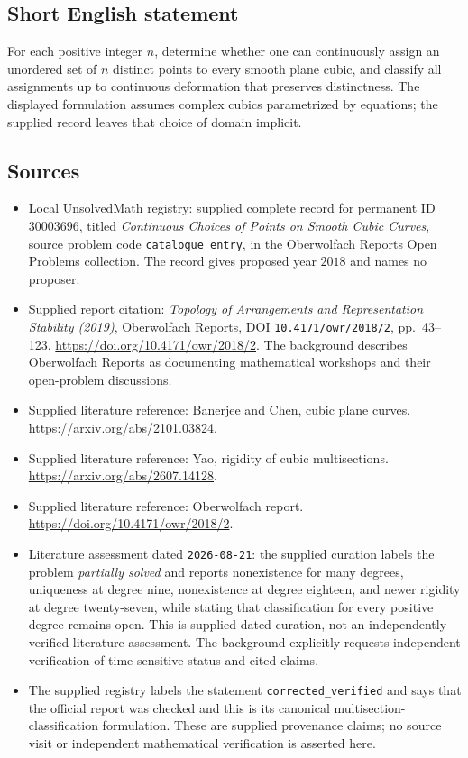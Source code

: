 \documentclass[11pt]{article}
\begin{document}
\subsection{Short English statement}
For each positive integer \(n\), determine whether one can continuously assign an unordered set of \(n\) distinct points to every smooth plane cubic, and classify all assignments up to continuous deformation that preserves distinctness. The displayed formulation assumes complex cubics parametrized by equations; the supplied record leaves that choice of domain implicit.
\subsection{Sources}
\begin{itemize}
\item Local UnsolvedMath registry: supplied complete record for permanent ID \(30003696\), titled \emph{Continuous Choices of Points on Smooth Cubic Curves}, source problem code \texttt{catalogue entry}, in the Oberwolfach Reports Open Problems collection. The record gives proposed year \(2018\) and names no proposer.
\item Supplied report citation: \emph{Topology of Arrangements and Representation Stability (2019)}, Oberwolfach Reports, DOI \texttt{10.4171/owr/2018/2}, pp.\ 43--123. \url{https://doi.org/10.4171/owr/2018/2}. The background describes Oberwolfach Reports as documenting mathematical workshops and their open-problem discussions.
\item Supplied literature reference: Banerjee and Chen, cubic plane curves. \url{https://arxiv.org/abs/2101.03824}.
\item Supplied literature reference: Yao, rigidity of cubic multisections. \url{https://arxiv.org/abs/2607.14128}.
\item Supplied literature reference: Oberwolfach report. \url{https://doi.org/10.4171/owr/2018/2}.
\item Literature assessment dated \texttt{2026-08-21}: the supplied curation labels the problem \emph{partially solved} and reports nonexistence for many degrees, uniqueness at degree nine, nonexistence at degree eighteen, and newer rigidity at degree twenty-seven, while stating that classification for every positive degree remains open. This is supplied dated curation, not an independently verified literature assessment. The background explicitly requests independent verification of time-sensitive status and cited claims.
\item The supplied registry labels the statement \texttt{corrected\_verified} and says that the official report was checked and this is its canonical multisection-classification formulation. These are supplied provenance claims; no source visit or independent mathematical verification is asserted here.
\end{itemize}
\end{document}
